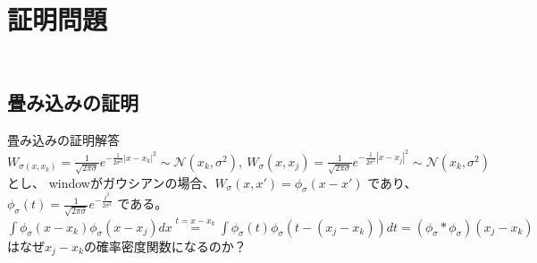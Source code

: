 \section{\\証明問題}

\subsection{\\畳み込みの証明}
\begin{reidai}{畳み込みの証明}{解答}
$W_{\sigma(x, x_k)} = \frac{1}{\sqrt{2\pi\sigma}} e^{-\frac{1}{2\sigma^2}|x-x_k|^2}\sim \mathcal{N}(x_k,\sigma^2),\ W_\sigma(x, x_j) = \frac{1}{\sqrt{2\pi\sigma}} e^{-\frac{1}{2\sigma^2}|x-x_j|^2}\sim \mathcal{N}(x_k,\sigma^2)$とし、
windowがガウシアンの場合、$W_\sigma(x, x') = \phi_\sigma(x - x')$ であり、$\phi_\sigma(t) = \frac{1}{\sqrt{2\pi\sigma}} e^{-\frac{t^2}{2\sigma^2}}$ である。
$ \displaystyle\int \phi_{\sigma}(x-x_k)\phi_{\sigma}(x-x_j)dx \displaystyle\overset{t=x-x_k}{=}\int \phi_{\sigma}(t)\phi_{\sigma}(t-(x_j-x_k))dt=\displaystyle (\phi_{\sigma}\ast\phi_{\sigma})(x_j-x_k)$はなぜ$x_j-x_k$の確率密度関数になるのか？
\end{reidai}
\kai \\

